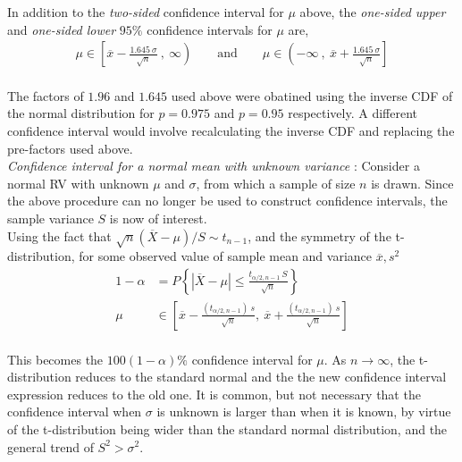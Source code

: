 In addition to the \textit{two-sided} confidence interval for $ \mu $ above, the \textit{one-sided upper} and \textit{one-sided lower} $ 95\% $ confidence intervals for $ \mu $ are, \\

\begin{align}
	\mu \in \left[ \overline{x} - \frac{1.645\ \sigma}{\sqrt{n}}\ ,\  \infty \right) \qquad \text{and} \qquad \mu \in \left( -\infty\ ,\  \overline{x} + \frac{1.645\ \sigma}{\sqrt{n}} \right]
\end{align}\\

The factors of $ 1.96 $ and $ 1.645 $ used above were obatined using the inverse CDF of the normal distribution for $ p = 0.975 $ and $ p = 0.95 $ respectively. A different confidence interval would involve recalculating the inverse CDF and replacing the pre-factors used above.\\

\textit{Confidence interval for a normal mean with unknown variance} : Consider a normal RV with unknown $ \mu $ and $ \sigma $, from which a sample of size $ n $ is drawn. Since the above procedure can no longer be used to construct confidence intervals, the sample variance $ S $ is now of interest. \\

Using the fact that $ \sqrt{n}(\overline{X} - \mu) / S \sim t_{n-1}$, and the symmetry of the t-distribution, for some observed value of sample mean and variance $ \overline{x}, s^2 $\\


\begin{align}
	1 - \alpha &= P \left\{ | \overline{X} - \mu | \leq \frac{t_{\alpha/2, n-1}\ S}{\sqrt{n}} \right\}  \nonumber \\
	\mu &\in \left[ \overline{x} - \frac{(t_{\alpha/2, n-1})\ s}{\sqrt{n}}, \ \overline{x} + \frac{(t_{\alpha/2, n-1})\ s}{\sqrt{n}} \right]
\end{align} \\

This becomes the $ 100(1-\alpha) \% $ confidence interval for $ \mu $. As $ n \to \infty $, the t-distribution reduces to the standard normal and the the new confidence interval expression reduces to the old one. It is common, but not necessary that the confidence interval when $ \sigma $ is unknown is larger than when it is known, by virtue of the t-distribution being wider than the standard normal distribution, and the general trend of $ S^2 > \sigma^2 $. \\

